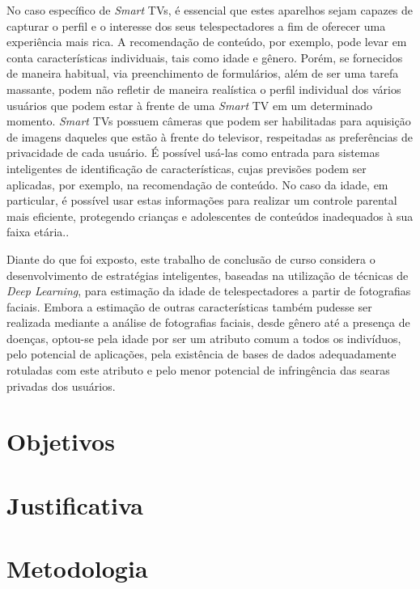 No caso específico de \emph{Smart} TVs, é essencial que estes aparelhos sejam capazes de capturar o perfil e o interesse dos seus telespectadores a fim de oferecer uma experiência mais rica. A recomendação de conteúdo, por exemplo, pode levar em conta características individuais, tais como idade e gênero. Porém, se fornecidos de maneira habitual, via preenchimento de formulários, além de ser uma tarefa massante, podem não refletir de maneira realística o perfil individual dos vários usuários que podem estar à frente de uma \emph{Smart} TV em um determinado momento.
%
\emph{Smart} TVs possuem câmeras que podem ser habilitadas para aquisição de imagens daqueles que estão à frente do televisor, respeitadas as preferências de privacidade de cada usuário. É possível usá-las como entrada para sistemas inteligentes de identificação de características, cujas previsões podem ser aplicadas, por exemplo, na recomendação de conteúdo. No caso da idade, em particular, é possível usar estas informações para realizar um controle parental mais eficiente, protegendo crianças e adolescentes de conteúdos inadequados à sua faixa etária.\cite{Guardian:CameraSmartv}.

Diante do que foi exposto, este trabalho de conclusão de curso considera o desenvolvimento de estratégias inteligentes, baseadas na utilização de técnicas de \emph{Deep Learning}, para estimação da idade de telespectadores a partir de fotografias faciais. Embora a estimação de outras características também pudesse ser realizada mediante a análise de fotografias faciais, desde gênero até a presença de doenças, optou-se pela idade por ser um atributo comum a todos os indivíduos, pelo potencial de aplicações, pela existência de bases de dados adequadamente rotuladas com este atributo e pelo menor potencial de infringência das searas privadas dos usuários.

\section{Objetivos}\label{sec:objetivo}


\section{Justificativa}\label{sec:just}


\section{Metodologia}\label{sec:metodo}


